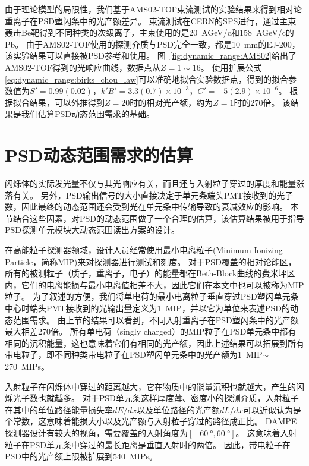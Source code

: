 由于理论模型的局限性，我们基于AMS02-TOF束流测试的实验结果\parencite{bindi_performance_2005}来得到相对论重离子在PSD塑闪条中的光产额差异。
束流测试在CERN的SPS进行，通过主束轰击Be靶得到不同种类的次级离子，主束使用的是\SI{20}{AGeV/c}和\SI{158}{AGeV/c}的Pb。
由于AMS02-TOF使用的探测介质与PSD完全一致，都是\SI{10}{mm}的EJ-200，该实验结果可以直接被PSD参考和使用。
图~\ref{fig:dynamic_range:AMS02}给出了AMS02-TOF得到的光响应曲线，数据点从$Z=1\sim16$。
使用扩展公式\ref{eq:dynamic_range:birks_chou_law}可以准确地拟合实验数据点，得到的拟合参数值为$S'=0.99(0.02)$，$k'B'=3.3(0.7)\times10^{-3}$，$C'=-5(2.9)\times10^{-6}$。
根据拟合结果，可以外推得到$Z=20$时的相对光产额，约为$Z=1$时的270倍。
该结果是我们估算PSD动态范围需求的基础。



\section{PSD动态范围需求的估算}
\label{sec:dynamic_range:estimation}
闪烁体的实际发光量不仅与其光响应有关，而且还与入射粒子穿过的厚度和能量涨落有关。
另外，PSD输出信号的大小直接决定于单元条端头PMT接收到的光子数，因此最终的动态范围还会受到光在单元条中传输导致的衰减效应的影响。
本节结合这些因素，对PSD的动态范围做了一个合理的估算，该估算结果被用于指导PSD探测单元模块大动态范围读出方案的设计。

在高能粒子探测器领域，设计人员经常使用最小电离粒子(Minimum Ionizing Particle，简称MIP)来对探测器进行测试和刻度。
对于PSD覆盖的相对论能区，所有的被测粒子（质子，重离子，电子）的能量都在Beth-Block曲线的费米坪区内，它们的电离能损与最小电离值相差不大，因此它们在本文中也可以被称为MIP粒子。
为了叙述的方便，我们将单电荷的最小电离粒子垂直穿过PSD塑闪单元条中心时端头PMT接收到的光输出量定义为\SI{1}{MIP}，并以它为单位来表述PSD的动态范围需求。
由上节的结果可以看到，不同入射重离子在PSD塑闪条中的光产额最大相差270倍。
所有单电荷（singly charged）的MIP粒子在PSD单元条中都有相同的沉积能量，这也意味着它们有相同的光产额，因此上述结果可以拓展到所有带电粒子，即不同种类带电粒子在PSD塑闪单元条中的光产额为\SI{1}{MIP}$\sim$\SI{270}{MIPs}。

入射粒子在闪烁体中穿过的距离越大，它在物质中的能量沉积也就越大，产生的闪烁光子数也就越多。
对于PSD单元条这样厚度薄、密度小的探测介质，入射粒子在其中的单位路径能量损失率$dE/dx$以及单位路径的光产额$dL/dx$可以近似认为是个常数，这意味着能损大小以及光产额与入射粒子穿过的路径成正比。
DAMPE探测器设计有较大的视角，需要覆盖的入射角度为$[\SI{-60}{\degree},\SI{60}{\degree}]$。
这意味着入射粒子在PSD单元条中穿过的最长距离是垂直入射时的两倍。
因此，带电粒子在PSD中的光产额上限被扩展到\SI{540}{MIPs}。

